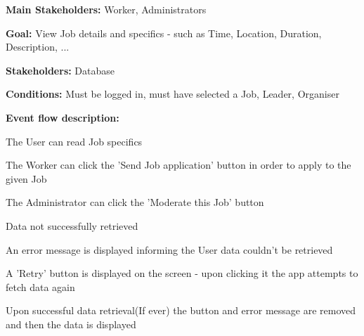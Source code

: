				\noindent {}
				\begin{packed_item}
					\item \textbf{Main Stakeholders:} Worker, Administrators
					\item \textbf{Goal:} View Job details and specifics - such as Time, Location, Duration, Description, ...
					\item \textbf{Stakeholders: } Database
					\item \textbf{Conditions: } Must be logged in, must have selected a Job, Leader, Organiser
					\item \textbf{Event flow description: }
					\begin{packed_enum}
						\item The User can read Job specifics
						\item The Worker can click the 'Send Job application' button in order to apply to the given Job
						\item The Administrator can click the 'Moderate this Job' button
					\end{packed_enum}
					
					\begin{packed_item}
						\item[1.a] Data not successfully retrieved
						\item[] \begin{packed_enum}
							\item An error message is displayed informing the User data couldn't be retrieved
							\item A 'Retry' button is displayed on the screen - upon clicking it the app attempts to fetch data again
							\item Upon successful data retrieval(If ever) the button and error message are removed and then the data is displayed
						\end{packed_enum}
					\end{packed_item}
				\end{packed_item}
			
